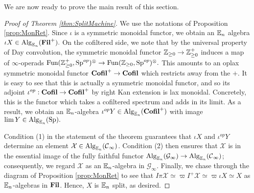 We are now ready to prove the main result of this section.

\begin{proof}[Proof of Theorem \ref{thm:SplitMachine}]
We use the notations of Proposition \ref{prop:MonRet}.  Since $\iota$ is a symmetric monoidal functor, we obtain an $\operatorname{\mathbb{E}}_n$ algebra $\iota X \in \operatorname{\text{Alg}}_{\operatorname{\mathbb{E}}_n}(\operatorname{\textbf{Fil}}^+).$  
On the cofiltered side, we note that by the universal property of Day convolution, the symmetric monoidal functor $\operatorname{\mathbb{Z}}_{\geq 0} \to \operatorname{\mathbb{Z}}_{\geq 0}^+$ induces a map of $\infty$-operads $\operatorname{\text{Fun}}(\operatorname{\mathbb{Z}}_{\geq 0}^+, \operatorname{\text{Sp}}^{op})^{\otimes} \to \operatorname{\text{Fun}}(\operatorname{\mathbb{Z}}_{\geq 0},\operatorname{\text{Sp}}^{op})^{\otimes}.$  This amounts to an oplax symmetric monoidal functor $\operatorname{\textbf{Cofil}}^+\to \operatorname{\textbf{Cofil}}$ which restricts away from the $+$.  It is easy to see that this is actually a symmetric monoidal functor, and so its adjoint $\iota^{op}: \operatorname{\textbf{Cofil}} \to \operatorname{\textbf{Cofil}}^+$ by right Kan extension is lax monoidal.  Concretely, this is the functor which takes a cofiltered spectrum and adds in its limit.  As a result, we obtain an $\operatorname{\mathbb{E}}_n$-algebra $\iota^{op}Y \in \operatorname{\text{Alg}}_{\operatorname{\mathbb{E}}_n}(\operatorname{\textbf{Cofil}}^+)$ with image $\lim Y\in \operatorname{\text{Alg}}_{\operatorname{\mathbb{E}}_n}(\operatorname{\text{Sp}}).$  

Condition (1) in the statement of the theorem guarantees that $\iota X$ and $\iota^{op}Y$ determine an element $\mathcal{X} \in \operatorname{\text{Alg}}_{\operatorname{\mathbb{E}}_n}(\operatorname{\mathcal{C}}_{\infty})$.  Condition (2) then ensures that $\mathcal{X}$ is in the essential image of the fully faithful functor $\operatorname{\text{Alg}}_{\operatorname{\mathbb{E}}_n}(\mathcal{G}_\infty) \to \operatorname{\text{Alg}}_{\operatorname{\mathbb{E}}_n}(\operatorname{\mathcal{C}}_\infty)$; consequently, we regard $\mathcal{X}$ as an $\operatorname{\mathbb{E}}_n$-algebra in $\mathcal{G}_{\infty}$.  Finally, we chase through the diagram of Proposition \ref{prop:MonRet} to see that $I\pi \mathcal{X} \simeq \varpi I^+ \mathcal{X} \simeq \varpi \iota X \simeq X$ as $\operatorname{\mathbb{E}}_n$-algebras in $\operatorname{\textbf{Fil}}$.   Hence, $X$ is $\operatorname{\mathbb{E}}_n$ split, as desired. 
\end{proof}




